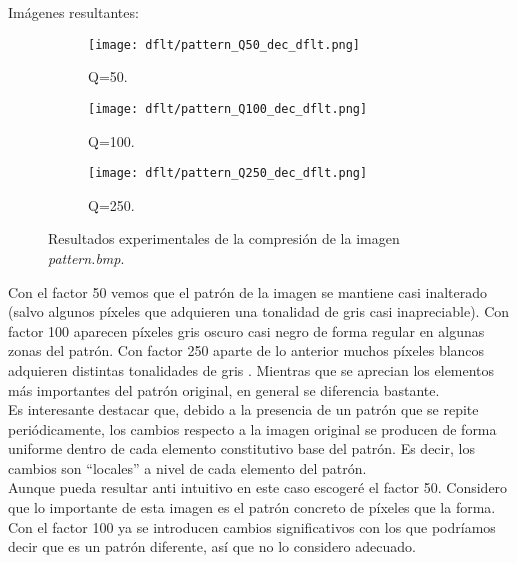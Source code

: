 \documentclass[12pt,a4paper]{article}
\begin{document}
Imágenes resultantes:
\begin{figure}[H]

    \begin{subfigure}{0.30\textwidth}
        \centering
        \texttt{[image: dflt/pattern\_Q50\_dec\_dflt.png]}
        \caption{Q=50.}
        
    \end{subfigure}
    \hfill
    \begin{subfigure}{0.30\textwidth}
        \centering
        \texttt{[image: dflt/pattern\_Q100\_dec\_dflt.png]}
        \caption{Q=100.}
        
    \end{subfigure}
    \hfill
    \begin{subfigure}{0.30\textwidth}
        \centering
        \texttt{[image: dflt/pattern\_Q250\_dec\_dflt.png]}
        \caption{Q=250.}
        
    \end{subfigure}
    
    \caption[Resultados experimentales - pattern]{Resultados experimentales de la compresión de la imagen \textit{pattern.bmp}.}
    
\end{figure}

Con el factor 50 vemos que el patrón de la imagen se mantiene casi inalterado (salvo algunos píxeles que adquieren una tonalidad de gris casi inapreciable). Con factor 100 aparecen píxeles gris oscuro casi negro de forma regular en algunas zonas del patrón. Con factor 250 aparte de lo anterior muchos píxeles blancos adquieren distintas tonalidades de gris . Mientras que se aprecian los elementos más importantes del patrón original, en general se diferencia bastante.\\

Es interesante destacar que, debido a la presencia de un patrón que se repite periódicamente, los cambios respecto a la imagen original se producen de forma uniforme dentro de cada elemento constitutivo base del patrón. Es decir, los cambios son ``locales'' a nivel de cada elemento del patrón.\\

Aunque pueda resultar anti intuitivo en este caso escogeré el factor 50. Considero que lo importante de esta imagen es el patrón concreto de píxeles que la forma. Con el factor 100 ya se introducen cambios significativos con los que podríamos decir que es un patrón diferente, así que no lo considero adecuado. \\
\end{document}
